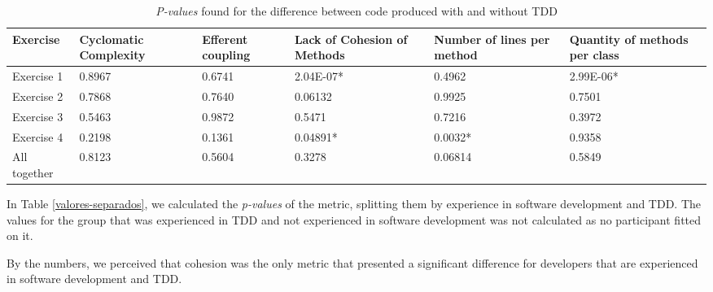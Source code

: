 \documentclass[times]{speauth}
\begin{document}
\begin{table*}
	\centering
	\begin{tabular}{ | p{2cm} | p{2cm} | p{1.7cm} | p{2cm} | p{1.7cm} | p{1.7cm} |}
		\hline
		\textbf{Exercise} & \textbf{Cyclomatic Complexity} & \textbf{Efferent coupling} & \textbf{Lack of Cohesion of Methods} & \textbf{Number of lines per method} 
		& \textbf{Quantity of methods per class} \\
		\hline
		Exercise 1 &	0.8967	&	0.6741 &	\cellcolor[gray]{0.8}2.04E-07* &	0.4962 &	\cellcolor[gray]{0.8}2.99E-06* \\
		Exercise 2	& 0.7868	&	0.7640 &	0.06132 &	0.9925 &	0.7501 \\
		Exercise 3	& 0.5463	&	0.9872 &	0.5471 &	0.7216 &	0.3972\\
		Exercise 4	& 0.2198	&	0.1361 &	\cellcolor[gray]{0.8}0.04891* &	\cellcolor[gray]{0.8}0.0032* &	0.9358\\
		\hline
		All together &	0.8123	&	0.5604 &	0.3278 &	0.06814 &	0.5849\\
		\hline
	\end{tabular}
	\caption{\textit{P-values} found for the difference between code produced with and without TDD}
	\label{metricas-industria}
\end{table*}


In Table \ref{valores-separados}, we calculated the \textit{p-values} of the metric,
splitting them by experience in software development and TDD. The values for the group that
was experienced in TDD and not experienced in software development was not calculated as no
participant fitted on it.

By the numbers, we perceived that cohesion was the only metric that presented a significant
difference for developers that are experienced in software development and TDD.
\end{document}

